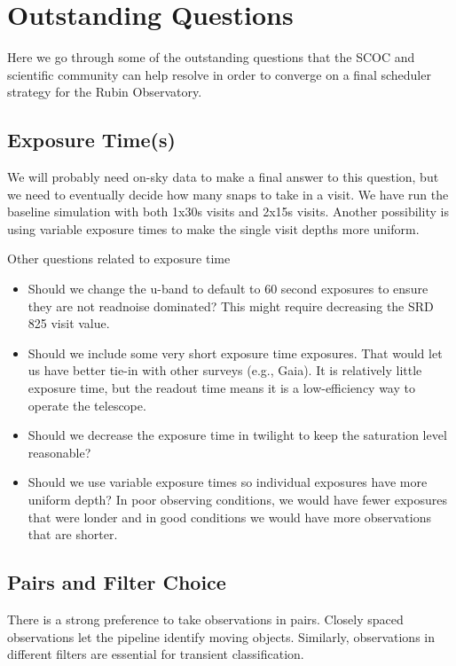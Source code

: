 
\section{Outstanding Questions}\label{sec:questions}

Here we go through some of the outstanding questions that the SCOC and scientific community can help resolve in order to converge on a final scheduler strategy for the Rubin Observatory. 

\subsection{Exposure Time(s)}

We will probably need on-sky data to make a final answer to this question, but we need to eventually decide how many snaps to take in a visit. We have run the baseline simulation with both 1x30s visits and 2x15s visits. Another possibility is using variable exposure times to make the single visit depths more uniform.

Other questions related to exposure time
\begin{itemize}
    \item{Should we change the u-band to default to 60 second exposures to ensure they are not readnoise dominated? This might require decreasing the SRD 825 visit value.}
    \item{Should we include some very short exposure time exposures. That would let us have better tie-in with other surveys (e.g., Gaia).  It is relatively little exposure time, but the readout time means it is a low-efficiency way to operate the telescope.}
    \item{Should we decrease the exposure time in twilight to keep the saturation level reasonable?}
    \item{Should we use variable exposure times so individual exposures have more uniform depth? In poor observing conditions, we would have fewer exposures that were londer and in good conditions we would have more observations that are shorter.}
\end{itemize}


\subsection{Pairs and Filter Choice}

There is a strong preference to take observations in pairs. Closely spaced observations let the pipeline identify moving objects. Similarly, observations in different filters are essential for transient classification. 


